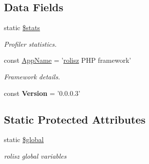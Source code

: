 \subsection*{Data Fields}
\begin{DoxyCompactItemize}
\item 
\hypertarget{classbase_ac61adefb58583938c9b820405ddfa018}{
static \hyperlink{classbase_ac61adefb58583938c9b820405ddfa018}{\$stats}}
\label{classbase_ac61adefb58583938c9b820405ddfa018}

\begin{DoxyCompactList}\small\item\em Profiler statistics. \item\end{DoxyCompactList}\end{DoxyCompactItemize}
{\bf }\par
\begin{DoxyCompactItemize}
\item 
\hypertarget{classbase_aab75444b144ffc4e972a9170e0a76ec0}{
const \hyperlink{classbase_aab75444b144ffc4e972a9170e0a76ec0}{AppName} = '\hyperlink{classrolisz}{rolisz} PHP framework'}
\label{classbase_aab75444b144ffc4e972a9170e0a76ec0}

\begin{DoxyCompactList}\small\item\em Framework details. \item\end{DoxyCompactList}\item 
\hypertarget{classbase_a62e44de9100d83ee01f5b4875b49a02b}{
const {\bfseries Version} = '0.0.0.3'}
\label{classbase_a62e44de9100d83ee01f5b4875b49a02b}

\end{DoxyCompactItemize}

\subsection*{Static Protected Attributes}
\begin{DoxyCompactItemize}
\item 
\hypertarget{classbase_aad844777d9d6beb4ca7c92d97afe7d27}{
static \hyperlink{classbase_aad844777d9d6beb4ca7c92d97afe7d27}{\$global}}
\label{classbase_aad844777d9d6beb4ca7c92d97afe7d27}

\begin{DoxyCompactList}\small\item\em rolisz global variables \item\end{DoxyCompactList}\end{DoxyCompactItemize}


